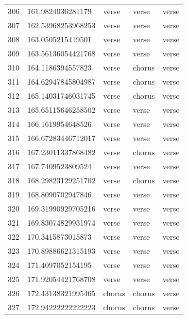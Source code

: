 \begin{table}[]
\begin{tabular}{lllll}
    306  & 161.9824036281179  & verse        & verse           & verse          \\
    307  & 162.53968253968253 & verse        & verse           & verse          \\
    308  & 163.0505215419501  & verse        & verse           & verse          \\
    309  & 163.56136054421768 & verse        & verse           & verse          \\
    310  & 164.1186394557823  & verse        & chorus          & verse          \\
    311  & 164.62947845804987 & verse        & chorus          & verse          \\
    312  & 165.14031746031745 & verse        & chorus          & verse          \\
    313  & 165.65115646258502 & verse        & verse           & verse          \\
    314  & 166.1619954648526  & verse        & verse           & verse          \\
    315  & 166.67283446712017 & verse        & verse           & verse          \\
    316  & 167.23011337868482 & verse        & chorus          & verse          \\
    317  & 167.7409523809524  & verse        & verse           & verse          \\
    318  & 168.29823129251702 & verse        & chorus          & verse          \\
    319  & 168.8090702947846  & verse        & verse           & verse          \\
    320  & 169.31990929705216 & verse        & verse           & verse          \\
    321  & 169.83074829931974 & verse        & verse           & verse          \\
    322  & 170.3415873015873  & verse        & verse           & verse          \\
    323  & 170.89886621315193 & verse        & verse           & verse          \\
    324  & 171.4097052154195  & verse        & verse           & verse          \\
    325  & 171.92054421768708 & verse        & verse           & verse          \\
    326  & 172.43138321995465 & chorus       & chorus          & verse          \\
    327  & 172.94222222222223 & chorus       & chorus          & verse          \\

\end{tabular}
\end{table}
